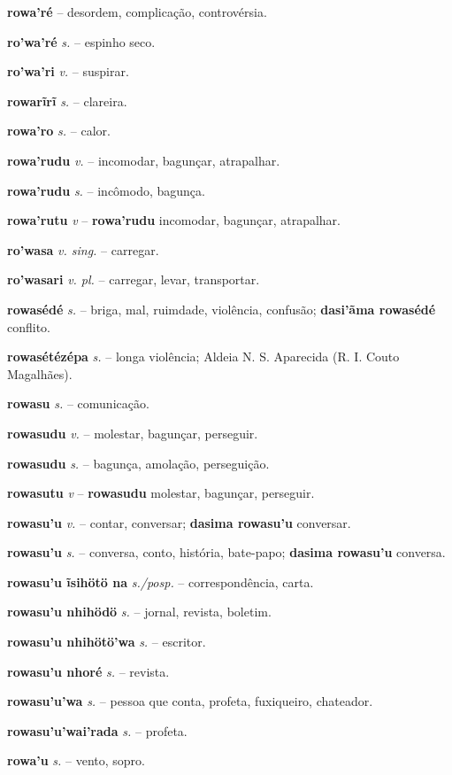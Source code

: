 \textbf{rowa'ré} \textit{} -- desordem, complicação, controvérsia.

\textbf{ro'wa'ré} \textit{s.} -- espinho seco.

\textbf{ro'wa'ri} \textit{v.} -- suspirar.

\textbf{rowarĩrĩ} \textit{s.} -- clareira.

\textbf{rowa'ro} \textit{s.} -- calor.

\textbf{rowa'rudu} \textit{v.} -- incomodar, bagunçar, atrapalhar.

\textbf{rowa'rudu} \textit{s.} -- incômodo, bagunça.

\textbf{rowa'rutu} \textit{v} -- \textbf{rowa'rudu} incomodar, bagunçar, atrapalhar.

\textbf{ro'wasa} \textit{v. sing.} -- carregar.

\textbf{ro'wasari} \textit{v. pl.} -- carregar, levar, transportar.

\textbf{rowasédé} \textit{s.} -- briga, mal, ruimdade, violência, confusão; \textbf{dasi'ãma rowasédé} conflito.

\textbf{rowasétézépa} \textit{s.} -- longa violência; Aldeia N. S. Aparecida (R. I. Couto Magalhães).

\textbf{rowasu} \textit{s.} -- comunicação.

\textbf{rowasudu} \textit{v.} -- molestar, bagunçar, perseguir.

\textbf{rowasudu} \textit{s.} -- bagunça, amolação, perseguição.

\textbf{rowasutu} \textit{v} -- \textbf{rowasudu} molestar, bagunçar, perseguir.

\textbf{rowasu'u} \textit{v.} -- contar, conversar; \textbf{dasima rowasu'u} conversar.

\textbf{rowasu'u} \textit{s.} -- conversa, conto, história, bate-papo; \textbf{dasima rowasu'u} conversa.

\textbf{rowasu'u ĩsihötö na} \textit{s./posp.} -- correspondência, carta.

\textbf{rowasu'u nhihödö} \textit{s.} -- jornal, revista, boletim.

\textbf{rowasu'u nhihötö'wa} \textit{s.} -- escritor.

\textbf{rowasu'u nhoré} \textit{s.} -- revista.

\textbf{rowasu'u'wa} \textit{s.} -- pessoa que conta, profeta, fuxiqueiro, chateador.

\textbf{rowasu'u'wai'rada} \textit{s.} -- profeta.

\textbf{rowa'u} \textit{s.} -- vento, sopro.

